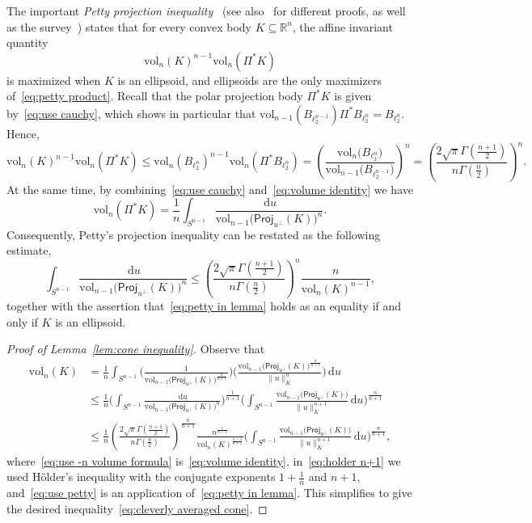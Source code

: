 \documentclass[11pt,reqno]{amsart}
\renewcommand{\le}{\leqslant}
\newcommand{\ud}[0]{\,\mathrm{d}}
\newcommand{\proj}{\mathsf{Proj}}
\newcommand{\R}{\mathbb R}
\theoremstyle{remark}
\renewcommand{\subset}{\subseteq}
\newcommand{\vol}{\mathrm{vol}}
\renewcommand{\1}{\mathbf 1}
\begin{document}
The important {\em Petty projection inequality}~\cite{Pet71} (see also~\cite{Sch95,MM96} for different proofs, as well as the survey~\cite{Lut93}) states that for every convex body $K\subset \R^n$, the affine invariant quantity
\begin{equation}\label{eq:petty product}
\vol_n(K)^{n-1}\vol_n(\Pi^{*}K)
\end{equation}
 is maximized when $K$ is an ellipsoid, and  ellipsoids are the only maximizers of~\eqref{eq:petty product}. Recall that the polar projection body $\Pi^*K$ is given by~\eqref{eq:use cauchy}, which shows in particular that  $\vol_{n-1}(B_{\ell_2^{n-1}})\Pi^{ *}\!B_{\ell_2^n}=B_{\ell_2^n}$. Hence,
$$
\vol_n(K)^{n-1}\vol_n(\Pi^{*}K)\le \vol_n(B_{\ell_2^n})^{n-1}\vol_n(\Pi^{*}B_{\ell_2^n})=\left(\frac{\vol_n\big(B_{\ell_2^n}\big)}{\vol_{n-1}\big(B_{\ell_2^{n-1}}\big)}\right)^{n}
=\left( \frac{2\sqrt{\pi}\Gamma\left(\frac{n+1}{2}\right)}{n\Gamma\left(\frac{n}{2}\right)}\right)^n.
$$
At the same time, by combining~\eqref{eq:use cauchy} and~\eqref{eq:volume identity} we have
$$
\vol_n(\Pi^*K)=\frac{1}{n}\int_{S^{n-1}}\frac{\ud u}{\vol_{n-1}\big(\proj_{u^\perp}(K)\big)^n}.
$$
Consequently, Petty's projection inequality can be restated as the following estimate,
\begin{equation}\label{eq:petty in lemma}
\int_{S^{n-1}}\frac{\ud u}{\vol_{n-1}\big(\proj_{u^\perp}(K)\big)^n}\le \left( \frac{2\sqrt{\pi}\Gamma\left(\frac{n+1}{2}\right)}{n\Gamma\left(\frac{n}{2}\right)}\right)^n\frac{n}{\vol_n(K)^{n-1}},
\end{equation}
together with the assertion that~\eqref{eq:petty in lemma} holds as an equality if and only if $K$ is an ellipsoid.


\begin{proof}[Proof of Lemma~\ref{lem:cone inequality}] Observe that
\begin{align}
\vol_n(K)&=\frac{1}{n}\int_{S^{n-1}}  \Bigg(\frac{1}{\vol_{n-1}\big(\proj_{u^\perp}(K)\big)^{\frac{n}{n+1}}}\Bigg) \Bigg(\frac{\vol_{n-1}\big(\proj_{u^\perp}(K)\big)^{\frac{n}{n+1}}}{\|u\|_K^{n}} \Bigg)\ud u \label{eq:use -n volume formula} \\ &\le \frac{1}{n}\bigg(\int_{S^{n-1}}\frac{\ud u}{\vol_{n-1}\big(\proj_{u^\perp}(K)\big)^n} \bigg)^{\frac{1}{n+1}}\bigg(\int_{S^{n-1}} \frac{\vol_{n-1}\big(\proj_{u^\perp}(K)\big)}{\|u\|_K^{n+1}}\ud u\bigg)^{\frac{n}{n+1}} \label{eq:holder n+1}\\&\le
\frac{1}{n}\left( \frac{2\sqrt{\pi}\Gamma\left(\frac{n+1}{2}\right)}{n\Gamma\left(\frac{n}{2}\right)}\right)^{\frac{n}{n+1}}
\frac{n^{\frac{1}{n+1}}}{\vol_n(K)^{\frac{n-1}{n+1}}}\bigg(\int_{S^{n-1}} \frac{\vol_{n-1}\big(\proj_{u^\perp}(K)\big)}{\|u\|_K^{n+1}}\ud u\bigg)^{\frac{n}{n+1}} \label{eq:use petty},
\end{align}
where~\eqref{eq:use -n volume formula}  is~\eqref{eq:volume identity}, in~\eqref{eq:holder n+1} we used H\"older's inequality with the conjugate exponents $1+\frac{1}{n}$ and $n+1$, and~\eqref{eq:use petty} is an application of~\eqref{eq:petty in lemma}. This simplifies to give the desired inequality~\eqref{eq:cleverly averaged cone}.
\end{proof}
\end{document}
